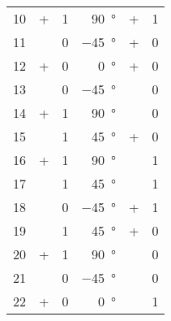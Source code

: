\begin{longtable}[c]{rccrcc}
	10\hspace{1.5em} &      + & 1 & \qty{ 90}{\degree}\hspace{1.5em} &      + & 1 \\
	11\hspace{1.5em} & \times & 0 & \qty{-45}{\degree}\hspace{1.5em} &      + & 0 \\
	12\hspace{1.5em} &      + & 0 & \qty{  0}{\degree}\hspace{1.5em} &      + & 0 \\
	13\hspace{1.5em} & \times & 0 & \qty{-45}{\degree}\hspace{1.5em} & \times & 0 \\
	14\hspace{1.5em} &      + & 1 & \qty{ 90}{\degree}\hspace{1.5em} & \times & 0 \\
	15\hspace{1.5em} & \times & 1 & \qty{ 45}{\degree}\hspace{1.5em} &      + & 0 \\
	16\hspace{1.5em} &      + & 1 & \qty{ 90}{\degree}\hspace{1.5em} & \times & 1 \\
	17\hspace{1.5em} & \times & 1 & \qty{ 45}{\degree}\hspace{1.5em} & \times & 1 \\
	18\hspace{1.5em} & \times & 0 & \qty{-45}{\degree}\hspace{1.5em} &      + & 1 \\
	19\hspace{1.5em} & \times & 1 & \qty{ 45}{\degree}\hspace{1.5em} &      + & 0 \\
	20\hspace{1.5em} &      + & 1 & \qty{ 90}{\degree}\hspace{1.5em} & \times & 0 \\
	21\hspace{1.5em} & \times & 0 & \qty{-45}{\degree}\hspace{1.5em} & \times & 0 \\
	22\hspace{1.5em} &      + & 0 & \qty{  0}{\degree}\hspace{1.5em} & \times & 1 \\

\end{longtable}
